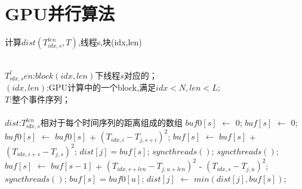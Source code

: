 \chapter{GPU并行算法}
\label{cha:china}


\begin{algorithm}
	\caption{计算$dist(T_{idx,s}^{len},T)$,线程s,块(idx,len)}
	\label{alg:kernel_ComputeDist}
	\begin{algorithmic}[1]
		\Require ~~\\
		$T_{idx,s}^len$:$block(idx,len)$下线程$s$对应的{\color{red}{候选序列}}；\\
		$(idx,len)$:GPU计算中的一个block,满足$idx < N,len < L$;\\
		$T$:整个事件序列；\\
		\Ensure ~~\\
		$dist$:$T_{idx,s}^{len}$相对于每个时间序列的距离组成的数组
			\State $buf0[s]$ $\gets$ $0$;
			\State  $buf[s]$ $\gets$ $0$;
				\State $buf0[s]$ $\gets$ $buf0[s]$ + $(T_{idx,i}-T_{j,s+i})^2$;
				\State $buf[s]$ $\gets$ $buf[s]$ + $(T_{idx,i+s}-T_{j,s})^2$;
			\EndFor
			\State $dist[j] = buf[s]$;
			\State $syncthreads()$;
				\State $syncthreads()$;
					\State $buf[s]$ $\gets$ $buf[s-1]$ + $(T_{idx,s+len}-T_{j,u+len})^2$ - $(T_{idx,s}-T_{j,u})^2$;
				\EndIf
				\State $syncthreads()$;
					\State $buf[s]$ = $buf0[u]$;
				\EndIf
				\State $dist[j]$ $\gets$ $min(dist[j],buf[s])$;
			\EndFor
		\EndFor
	\end{algorithmic}
\end{algorithm}


